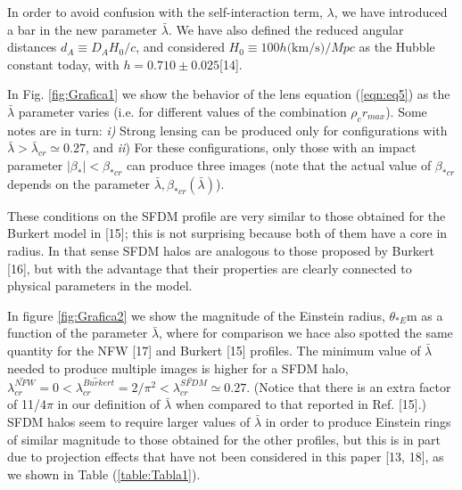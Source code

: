 \documentclass[9.5pt, twocolumn]{article}
\begin{document}
In order to avoid confusion with the self-interaction term, $\lambda$, we have introduced a bar in the new parameter $\bar{\lambda}$. We have also defined the reduced angular distances $d_A\equiv D_AH_0/c$, and considered $H_0\equiv 100h\text{(km/s)}/Mpc$ as the Hubble constant today, with $h=0.710 \pm 0.025$[14].

In Fig. \ref{fig:Grafica1} we show the behavior of the lens equation (\ref{eqn:eq5})
as the $\bar{\lambda}$ parameter varies (i.e. for different values of the
combination $\rho_cr_{max}$). Some notes are in turn: \textit{i)} Strong
lensing can be produced only for configurations with $\bar{\lambda}>\bar{\lambda}_{cr}\simeq 0.27$, and \textit{ii}) For these configurations, only those with an impact parameter $|\beta_*|<\beta_{*cr}$ can produce three images (note that the actual value of $\beta_{*cr}$ depends on the parameter $\bar{\lambda}, \beta_{*cr}(\bar{\lambda})$).

These conditions on the SFDM profile are very similar
to those obtained for the Burkert model in [15]; this is not
surprising because both of them have a core in radius. In
that sense SFDM halos are analogous to those proposed
by Burkert [16], but with the advantage that their properties
are clearly connected to physical parameters in the
model.

In figure \ref{fig:Grafica2} we show the magnitude of the Einstein radius, $\theta_{*E}$m as a function of the parameter $\bar{\lambda}$, where for comparison we hace also spotted the same quantity for the NFW [17] and Burkert [15] profiles. The minimum value of $\bar{\lambda}$ needed to produce multiple images is higher for a SFDM halo, $\bar{\lambda_{cr}^{NFW}}=0<\bar{\lambda_{cr}^{Burkert}}=2/\pi^2<\bar{\lambda_{cr}^{SFDM}}\simeq 0.27$. (Notice that there is an extra factor of 11/4$\pi$ in our definition of $\bar{\lambda}$ when compared to that reported in Ref. [15].) SFDM halos seem to require larger values of $\bar{\lambda}$ in order to produce Einstein rings of similar magnitude
to those obtained for the other profiles, but this is in part
due to projection effects that have not been considered
in this paper [13, 18], as we shown in Table (\ref{table:Tabla1}).
\end{document}

